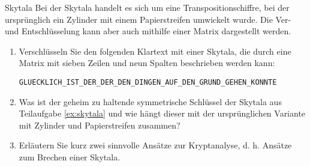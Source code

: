 \documentclass{article}
\author{Leopold Lemmermann}
\begin{document}
\createtitle


\setcounter{subsection}{10}
\begin{exercise}{Skytala}
  Bei der Skytala handelt es sich um eine Transpositionschiffre, bei der ursprünglich ein Zylinder mit einem Papierstreifen umwickelt wurde. Die Ver- und Entschlüsselung kann aber auch mithilfe einer Matrix dargestellt werden.
  \begin{enumerate}
    \item\label{ex:skytala} Verschlüsseln Sie den folgenden Klartext mit einer Skytala, die durch eine Matrix mit sieben Zeilen und neun Spalten beschrieben werden kann:
      \begin{center}
        \texttt{GLUECKLICH\_IST\_DER\_DER\_DEN\_DINGEN\_AUF\_DEN\_GRUND\_GEHEN\_KONNTE}
      \end{center}
    \item Was ist der geheim zu haltende symmetrische Schlüssel der Skytala aus Teilaufgabe \ref{ex:skytala} und wie hängt dieser mit der ursprünglichen Variante mit Zylinder und Papierstreifen zusammen?
    \item Erläutern Sie kurz zwei sinnvolle Ansätze zur Kryptanalyse, d. h. Ansätze zum Brechen einer Skytala.
  \end{enumerate}


\end{exercise}
\end{document}
